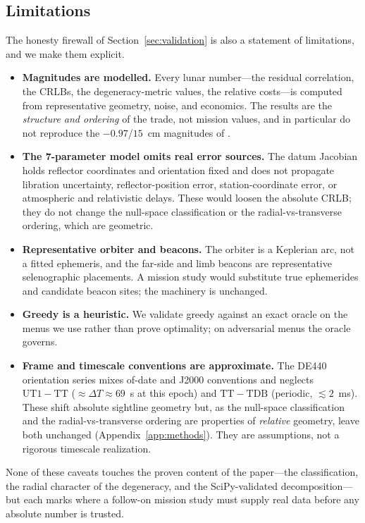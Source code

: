 \subsection{Limitations}
\label{sec:limitations}

The honesty firewall of Section~\ref{sec:validation} is also a statement of
limitations, and we make them explicit.

\begin{itemize}
  \item \textbf{Magnitudes are modelled.} Every lunar number---the residual
  correlation, the CRLBs, the degeneracy-metric values, the relative costs---is
  computed from representative geometry, noise, and economics. The results are the
  \emph{structure and ordering} of the trade, not mission values, and in particular
  do not reproduce the $-0.97$/$15$~cm magnitudes of \citet{sosnica2025ilrf}.
  \item \textbf{The 7-parameter model omits real error sources.} The datum
  Jacobian holds reflector coordinates and orientation fixed and does not propagate
  libration uncertainty, reflector-position error, station-coordinate error, or
  atmospheric and relativistic delays. These would loosen the absolute CRLB; they
  do not change the null-space classification or the radial-vs-transverse ordering,
  which are geometric.
  \item \textbf{Representative orbiter and beacons.} The orbiter is a Keplerian arc,
  not a fitted ephemeris, and the far-side and limb beacons are representative
  selenographic placements. A mission study would substitute true ephemerides and
  candidate beacon sites; the machinery is unchanged.
  \item \textbf{Greedy is a heuristic.} We validate greedy against an exact oracle
  on the menus we use rather than prove optimality; on adversarial menus the oracle
  governs.
  \item \textbf{Frame and timescale conventions are approximate.} The DE440
  orientation series mixes of-date and J2000 conventions and neglects
  $\mathrm{UT1}-\mathrm{TT}$ ($\approx\!\Delta T\approx69$~s at this epoch) and
  $\mathrm{TT}-\mathrm{TDB}$ (periodic, $\lesssim2$~ms). These shift absolute
  sightline geometry but, as the null-space classification and the
  radial-vs-transverse ordering are properties of \emph{relative} geometry, leave
  both unchanged (Appendix~\ref{app:methods}). They are \Modelled{} assumptions,
  not a rigorous timescale realization.
\end{itemize}

None of these caveats touches the proven content of the paper---the classification,
the radial character of the degeneracy, and the SciPy-validated decomposition---but
each marks where a follow-on mission study must supply real data before any absolute
number is trusted.
